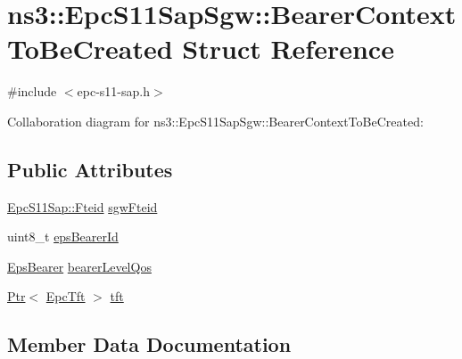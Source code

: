 \hypertarget{structns3_1_1EpcS11SapSgw_1_1BearerContextToBeCreated}{}\section{ns3\+:\+:Epc\+S11\+Sap\+Sgw\+:\+:Bearer\+Context\+To\+Be\+Created Struct Reference}
\label{structns3_1_1EpcS11SapSgw_1_1BearerContextToBeCreated}


{\ttfamily \#include $<$epc-\/s11-\/sap.\+h$>$}



Collaboration diagram for ns3\+:\+:Epc\+S11\+Sap\+Sgw\+:\+:Bearer\+Context\+To\+Be\+Created\+:
\subsection*{Public Attributes}
\begin{DoxyCompactItemize}
\item 
\hyperlink{structns3_1_1EpcS11Sap_1_1Fteid}{Epc\+S11\+Sap\+::\+Fteid} \hyperlink{structns3_1_1EpcS11SapSgw_1_1BearerContextToBeCreated_a970d76ae22296550096fab4e8668c314}{sgw\+Fteid}
\item 
uint8\+\_\+t \hyperlink{structns3_1_1EpcS11SapSgw_1_1BearerContextToBeCreated_abd4ec0c075eeb3a7497e205f58931b3b}{eps\+Bearer\+Id}
\item 
\hyperlink{structns3_1_1EpsBearer}{Eps\+Bearer} \hyperlink{structns3_1_1EpcS11SapSgw_1_1BearerContextToBeCreated_a6115b2db46a661bd5c249fec81cf56db}{bearer\+Level\+Qos}
\item 
\hyperlink{classns3_1_1Ptr}{Ptr}$<$ \hyperlink{classns3_1_1EpcTft}{Epc\+Tft} $>$ \hyperlink{structns3_1_1EpcS11SapSgw_1_1BearerContextToBeCreated_ac3ca36bce692f0d7dae63354f33fdb49}{tft}
\end{DoxyCompactItemize}


\subsection{Member Data Documentation}
